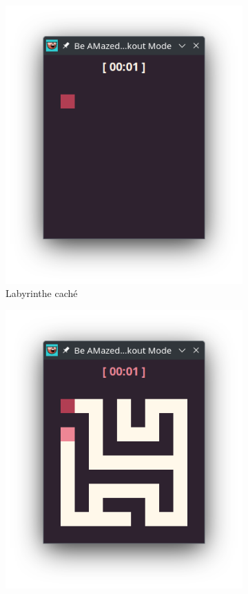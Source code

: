 \begin{figure}[!htb]
    \begin{subfigure}[b]{0.3\textwidth}
        \includegraphics[width=\textwidth]{ressources/Implementation/Labyrinthe/Vue/Blackout/BlackoutDark.png}
        \caption{Labyrinthe caché}
    \end{subfigure}
    \hfill
    \begin{subfigure}[b]{0.3\textwidth}
        \includegraphics[width=\textwidth]{ressources/Implementation/Labyrinthe/Vue/Blackout/BlackoutLight.png}

\end{subfigure}
\end{figure}
